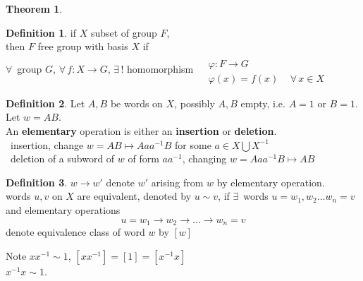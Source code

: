 \documentclass[twoside,landscape]{amsart}
\theoremstyle{plain}
\newtheorem{theorem}{Theorem}
\theoremstyle{definition}
\newtheorem{definition}{Definition}
\theoremstyle{remark}
\begin{document}
\begin{multicols*}{2}
\begin{theorem}

\end{theorem}




\begin{definition}
  if $X$ subset of group $F$, \\
then $F$ free group with basis $X$ if \\
$\forall \, $ group $G$, $\forall \, f: X\to G$, $\exists \, !$ homomorphism $\begin{aligned} & \quad \\
  & \varphi : F \to G \\
  & \varphi(x) = f(x) \quad \, \forall \, x \in X \end{aligned}$



\end{definition}


\begin{definition}
  Let $A,B$ be words on $X$, possibly $A,B$ empty, i.e. $A=1$ or $B=1$.  Let $w=AB$.  \\
An \textbf{elementary} operation is either an \textbf{insertion} or \textbf{deletion}.   \\
\qquad \, insertion, change $w=AB \mapsto Aaa^{-1} B$ for some $a\in X \bigcup X^{-1}$ \\
\qquad \, deletion of a subword of $w$ of form $aa^{-1}$, changing $w= Aaa^{-1}B \mapsto AB$
\end{definition}

\begin{definition}
  $w\to w'$ denote $w'$ arising from $w$ by elementary operation.  \\
words $u,v$ on $X$ are equivalent, denoted by $u\sim v$, if $\exists \, $ words $u=w_1,w_2 \dots w_n = v$ and elementary operations
\[
u=w_1 \to w_2 \to \dots \to w_n =v
\]
denote equivalence class of word $w$ by $[w]$
\end{definition}
Note $xx^{-1} \sim 1$, $[xx^{-1}] = [1] = [x^{-1}x]$ \\
\phantom{Note} $x^{-1}x\sim 1$.  


\end{multicols*}
\end{document}
